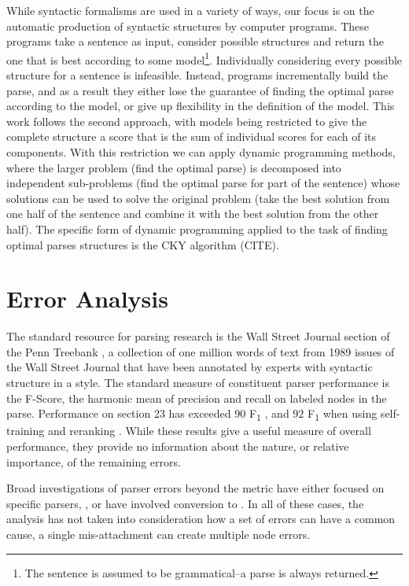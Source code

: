 While syntactic formalisms are used in a variety of ways, our focus is on the automatic production of syntactic structures by computer programs.
These programs take a sentence as input, consider possible structures and return the one that is best according to some model\footnote{The sentence is assumed to be grammatical--a parse is always returned.}.
Individually considering every possible structure for a sentence is infeasible.
Instead, programs incrementally build the parse, and as a result they either lose the guarantee of finding the optimal parse according to the model, or give up flexibility in the definition of the model.
This work follows the second approach, with models being restricted to give the complete structure a score that is the sum of individual scores for each of its components.
With this restriction we can apply dynamic programming methods, where the larger problem (find the optimal parse) is decomposed into independent sub-problems (find the optimal parse for part of the sentence) whose solutions can be used to solve the original problem (take the best solution from one half of the sentence and combine it with the best solution from the other half).
The specific form of dynamic programming applied to the task of finding optimal parses structures is the CKY algorithm (CITE).

\section{Error Analysis}

The standard resource for parsing research is the Wall Street Journal section of the Penn Treebank \parencite{ptb}, a collection of one million words of text from 1989 issues of the Wall Street Journal that have been annotated by experts with syntactic structure in a \gb style.
The standard measure of constituent parser performance is the F-Score, the harmonic mean of precision and recall on labeled nodes in the parse.
Performance on \wsj section 23 has exceeded $90$ F\textsubscript{1} \parencite{Petrov-Klein:2007}, and $92$ F\textsubscript{1} when using self-training and reranking \parencite{McClosky-Charniak-Johnson:2006,Charniak-Johnson:2005}. 
While these results give a useful measure of overall performance, they provide no information about the nature, or relative importance, of the remaining errors.

Broad investigations of parser errors beyond the \parseval metric \parencite{Black-etal:1991} have either focused on specific parsers, \myeg \parencite{Collins:2003}, or have involved conversion to \dg \parencite{Carroll-etal:1998,King:2003}.
In all of these cases, the analysis has not taken into consideration how a set of errors can have a common cause, \myeg a single mis-attachment can create multiple node errors.

